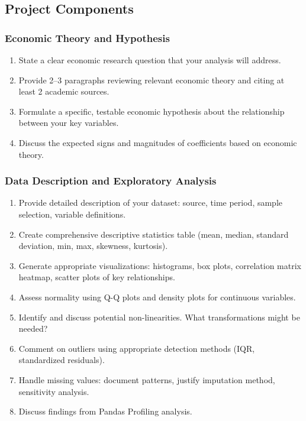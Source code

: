 
\subsection{Project Components}
\begingroup
\renewcommand{\labelenumi}{(\alph{enumi})}
\subsubsection{Economic Theory and Hypothesis}
\begin{enumerate}
    \item State a clear economic research question that your analysis will address.
    \item Provide 2--3 paragraphs reviewing relevant economic theory and citing at least 2 academic sources.
    \item Formulate a specific, testable economic hypothesis about the relationship between your key variables.
    \item Discuss the expected signs and magnitudes of coefficients based on economic theory.
\end{enumerate}

\subsubsection{Data Description and Exploratory Analysis}
\begin{enumerate}
    \item Provide detailed description of your dataset: source, time period, sample selection, variable definitions.
    \item Create comprehensive descriptive statistics table (mean, median, standard deviation, min, max, skewness, kurtosis).
    \item Generate appropriate visualizations: histograms, box plots, correlation matrix heatmap, scatter plots of key relationships.
    \item Assess normality using Q-Q plots and density plots for continuous variables.
    \item Identify and discuss potential non-linearities. What transformations might be needed?
    \item Comment on outliers using appropriate detection methods (IQR, standardized residuals).
    \item Handle missing values: document patterns, justify imputation method, sensitivity analysis.
    \item Discuss findings from Pandas Profiling analysis.
\end{enumerate}

